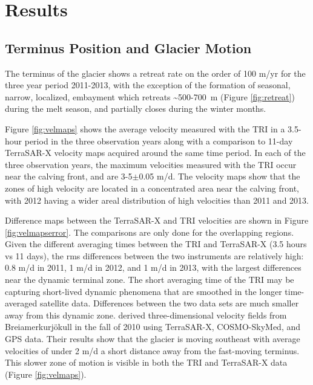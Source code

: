 \documentclass[review]{igs}
\begin{document}
\section{Results}
\subsection{Terminus Position and Glacier Motion}
The terminus of the glacier shows a retreat rate on the order of 100 m/yr for the three year period 2011-2013, with the exception of the formation of seasonal, narrow, localized, embayment which retreats \textasciitilde500-700~m (Figure \ref{fig:retreat}) during the melt season, and partially closes during the winter months. 



 Figure \ref{fig:velmaps} shows the average velocity measured with the TRI in a 3.5-hour period in the three observation years along with a comparison to 11-day TerraSAR-X velocity maps acquired around the same time period. 
In each of the three observation years, the maximum velocities measured with the TRI occur near the calving front, and are 3-5$\pm$0.05 m/d. The velocity maps show that the zones of high velocity are located in a concentrated area near the calving front, with 2012 having a wider areal distribution of high velocities than 2011 and 2013. 




 Difference maps between the TerraSAR-X and TRI velocities are shown in Figure \ref{fig:velmapserror}. The comparisons are only done for the overlapping regions. Given the different averaging times between the TRI and TerraSAR-X (3.5 hours vs 11 days), the rms differences between the two instruments are relatively high: 0.8 m/d in 2011, 1 m/d in 2012, and 1 m/d in 2013, with the largest differences near the dynamic terminal zone. The short averaging time of the TRI may be capturing short-lived dynamic phenomena that are smoothed in the longer time-averaged satellite data. Differences between the two data sets are much smaller away from this dynamic zone.
\citet{nagler2012retrieval} derived three-dimensional velocity fields from Brei{\dh}amerkurjökull in the fall of 2010 using TerraSAR-X, COSMO-SkyMed, and GPS data. Their results show that the glacier is moving southeast with average velocities of under 2 m/d a short distance away from the fast-moving terminus. This slower zone of motion is visible in both the TRI and TerraSAR-X data (Figure \ref{fig:velmaps}).
\end{document}

